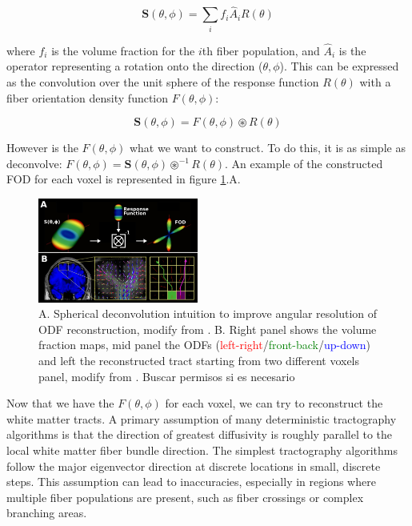 \documentclass{cys}
\begin{document}
\begin{equation}
\mathbf{S}(\theta,\phi)=\sum_i f_i \hat{A}_iR(\theta)
\end{equation}

where $f_i$ is the volume fraction for the $i$th fiber population, and $\hat{A}_i$ is the operator representing a rotation onto the direction ($\theta,\phi$). This can be expressed as the convolution over the unit sphere of the response function $R(\theta)$ with a fiber orientation density function $F(\theta,\phi)$:

\begin{equation}
\mathbf{S}(\theta,\phi)= F(\theta,\phi)\circledast R(\theta)
\end{equation} 

However is the $F(\theta,\phi)$ what we want to construct. To do this, it is as simple as deconvolve: $F(\theta,\phi)= \mathbf{S}(\theta,\phi) \circledast^{-1} R(\theta)$. An example of the constructed FOD for each voxel is represented in figure \ref{CSD}.A. 

\begin{figure}[H]
\centering
	\includegraphics[width=0.47\textwidth]{CST2}
	\caption{A. Spherical deconvolution intuition to improve angular resolution of ODF reconstruction, modify from \cite{descoteaux1999high}. B. Right panel shows the volume fraction maps, mid panel the ODFs (\textcolor{red}{left-right}/\textcolor{green}{front-back}/\textcolor{blue}{up-down}) and left the reconstructed tract starting from two different voxels panel,  modify from \cite{jeurissen2014multi}. Buscar permisos si es necesario}
	\label{CSD}
\end{figure}

\bigskip
Now that we have the $F(\theta,\phi)$ for each voxel, we can try to reconstruct the white matter tracts. A primary assumption of many deterministic tractography algorithms is that the direction of greatest diffusivity is roughly parallel to the local white matter ﬁber bundle direction. The simplest tractography algorithms follow the major eigenvector direction at discrete locations in small, discrete steps. This assumption can lead to inaccuracies, especially in regions where multiple fiber populations are present, such as fiber crossings or complex branching areas.
\end{document}
